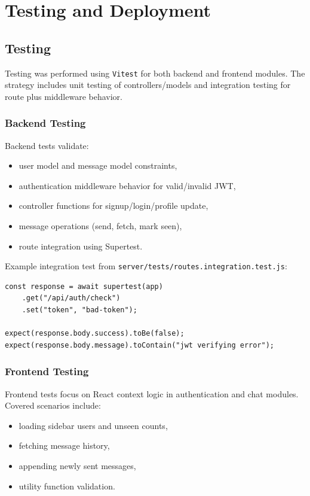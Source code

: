 \documentclass[12pt,a4paper]{report}
\begin{document}
\chapter{Testing and Deployment}

\section{Testing}
Testing was performed using \texttt{Vitest} for both backend and frontend modules. The strategy includes unit testing of controllers/models and integration testing for route plus middleware behavior.

\subsection{Backend Testing}
Backend tests validate:
\begin{itemize}
    \item user model and message model constraints,
    \item authentication middleware behavior for valid/invalid JWT,
    \item controller functions for signup/login/profile update,
    \item message operations (send, fetch, mark seen),
    \item route integration using Supertest.
\end{itemize}

Example integration test from \texttt{server/tests/routes.integration.test.js}:

\begin{verbatim}
const response = await supertest(app)
    .get("/api/auth/check")
    .set("token", "bad-token");

expect(response.body.success).toBe(false);
expect(response.body.message).toContain("jwt verifying error");
\end{verbatim}

\subsection{Frontend Testing}
Frontend tests focus on React context logic in authentication and chat modules. Covered scenarios include:
\begin{itemize}
    \item loading sidebar users and unseen counts,
    \item fetching message history,
    \item appending newly sent messages,
    \item utility function validation.
\end{itemize}
\end{document}

